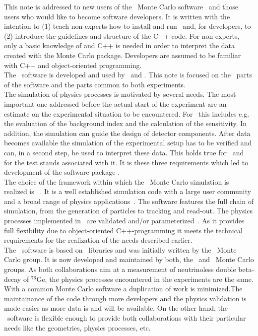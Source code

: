 This note is addressed to new users of the \gerda\ Monte Carlo
software \mage\ and those users who would like to become software
developers. It is written with the intention to (1) teach non-experts
how to install and run \mage\ and, for developers, to (2) introduce
the guidelines and structure of the C++ code. For non-experts, only a
basic knowledge of \rootv and C++ is needed in order to interpret the
data created with the Monte Carlo package. Developers are assumed to
be familiar with C++ and object-oriented programming. \\ 

The \mage\ software is developed and used by \majorana\ and \gerda.
This note is focused on the \gerda\ parts of the software and the
parts common to both experiments. \\

The simulation of physics processes is motivated by several needs. The
most important one addressed before the actual start of the experiment
are an estimate on the experimental situation to be encountered. For
\gerda\ this includes e.g. the evaluation of the background index and
the calculation of the sensitivity. In addition, the simulation can
guide the design of detector components. After data becomes available
the simulation of the experimental setup has to be verified and can,
in a second step, be used to interpret these data. This holds true for
\gerda\ and for the test stands associated with it. It is these three
requirements which led to development of the software package
\mage. \\

The choice of the framework within which the \gerda\ Monte Carlo
simulation is realized is \geant~\cite{Agostinelli:2002hh}. It is a
well established simulation code with a large user community and a
broad range of physics applications~\cite{Allison:2006ve}. The
software features the full chain of simulation, from the generation of
particles to tracking and read-out. The physics processes implemented
in \geant\ are validated and/or
parameterized~\cite{geant4physics,Amako:2005xf,Amako:2006nb}. As it
provides full flexibility due to object-oriented C++-programming it
meets the technical requirements for the realization of the needs
described earlier. \\

The \mage\ software is based on \geant\ libraries and was initially
written by the \majorana\ Monte Carlo group. It is now developed and
maintained by both, the \gerda\ and \majorana\ Monte Carlo groups. As
both collaborations aim at a measurement of neutrinoless double
beta-decay of $^{76}$Ge, the physics processes encountered in the
experiments are the same. With a common Monte Carlo software a
duplication of work is minimized.The maintainance of the code through 
more developers and the physics validation is made easier as more
data is and will be available. On the other hand, the \mage\ software
is flexible enough to provide both collaborations with their
particular needs like the geometries, physics processes, etc. \\

